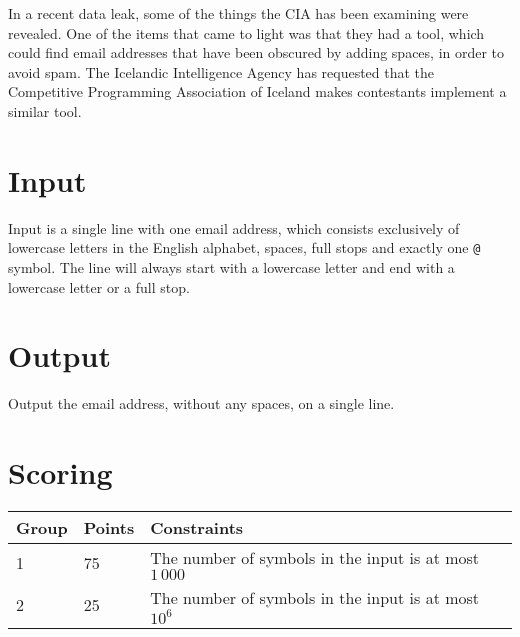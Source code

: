 
In a recent data leak, some of the things the CIA has been examining were revealed.
One of the items that came to light was that they had a tool, which could find email addresses that have been obscured by adding spaces, in order to avoid spam.
The Icelandic Intelligence Agency has requested that the Competitive Programming Association of Iceland makes contestants implement a similar tool.

\section*{Input}
Input is a single line with one email address, which consists exclusively of lowercase letters in the English alphabet, spaces, full stops and exactly one \texttt{@} symbol.
The line will always start with a lowercase letter and end with a lowercase letter or a full stop.

\section*{Output}
Output the email address, without any spaces, on a single line.

\section*{Scoring}
\begin{tabular}{|l|l|l|}
\hline
Group & Points & Constraints \\ \hline
1     & 75     & The number of symbols in the input is at most $1\,000$ \\ \hline
2     & 25     & The number of symbols in the input is at most $10^6$ \\ \hline
\end{tabular}

